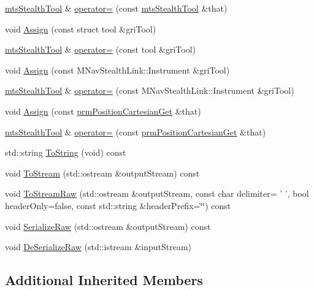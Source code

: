 \begin{DoxyCompactItemize}
\item 
\hyperlink{classmts_stealth_tool}{mts\-Stealth\-Tool} \& \hyperlink{classmts_stealth_tool_a8e34fac36f9e6eb356116e06d9ab61c2}{operator=} (const \hyperlink{classmts_stealth_tool}{mts\-Stealth\-Tool} \&that)
\item 
void \hyperlink{classmts_stealth_tool_aefb688f5db9e6cb54d8af92196928b81}{Assign} (const struct tool \&gri\-Tool)
\item 
\hyperlink{classmts_stealth_tool}{mts\-Stealth\-Tool} \& \hyperlink{classmts_stealth_tool_aa727d88e875cc02aeeebfb7fcc47afdd}{operator=} (const tool \&gri\-Tool)
\item 
void \hyperlink{classmts_stealth_tool_aca8cf9986410e2b155c77b4a58faee83}{Assign} (const M\-Nav\-Stealth\-Link\-::\-Instrument \&gri\-Tool)
\item 
\hyperlink{classmts_stealth_tool}{mts\-Stealth\-Tool} \& \hyperlink{classmts_stealth_tool_a8a9407407b9126f0195af0a4abe945c5}{operator=} (const M\-Nav\-Stealth\-Link\-::\-Instrument \&gri\-Tool)
\item 
void \hyperlink{classmts_stealth_tool_a371596656a661001c3691ae510dab17b}{Assign} (const \hyperlink{classprm_position_cartesian_get}{prm\-Position\-Cartesian\-Get} \&that)
\item 
\hyperlink{classmts_stealth_tool}{mts\-Stealth\-Tool} \& \hyperlink{classmts_stealth_tool_afd3d34f5974e9e9d182c0cf7b58b1c5e}{operator=} (const \hyperlink{classprm_position_cartesian_get}{prm\-Position\-Cartesian\-Get} \&that)
\item 
std\-::string \hyperlink{classmts_stealth_tool_a18a31c80172f4f6280673c1db6ca8c5b}{To\-String} (void) const 
\item 
void \hyperlink{classmts_stealth_tool_a7550641c7e9eb89a5d1a77f4d48c47e9}{To\-Stream} (std\-::ostream \&output\-Stream) const 
\item 
void \hyperlink{classmts_stealth_tool_a6bfabcb3bee465c02dc9c42578dfd220}{To\-Stream\-Raw} (std\-::ostream \&output\-Stream, const char delimiter= ' ', bool header\-Only=false, const std\-::string \&header\-Prefix=\char`\"{}\char`\"{}) const 
\item 
void \hyperlink{classmts_stealth_tool_a1fa41dcc1d7260a3ddd7f2d5ea7732c9}{Serialize\-Raw} (std\-::ostream \&output\-Stream) const 
\item 
void \hyperlink{classmts_stealth_tool_ad346445c8f547aac0f99e869a585d90a}{De\-Serialize\-Raw} (std\-::istream \&input\-Stream)
\end{DoxyCompactItemize}
\subsection*{Additional Inherited Members}


